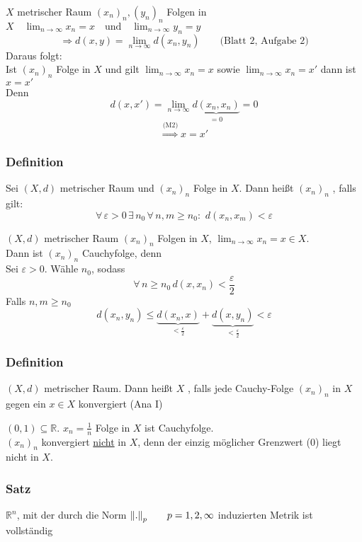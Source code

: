  $X$ metrischer Raum $(x_n)_n , (y_n)_n$ Folgen in $X \quad \lim_{n \to \infty}x_n=x \quad \text{und} \quad \lim_{n \to \infty}y_n=y$
\[
	\Rightarrow d(x,y)=\lim_{n \to \infty}d(x_n,y_n) \qquad \text{(Blatt 2, Aufgabe 2)}
\]
Daraus folgt: \\ Ist $(x_n)_n $ Folge in $X$ und gilt $\lim_{n \to \infty}x_n=x$ sowie $\lim_{n \to \infty}x_n=x'$ dann ist $x=x'$ \\
Denn \[
	d(x,x')=\lim_{n \to \infty}\underset{=0}{\underbrace{d(x_n,x_n)}}=0
\]
\[
	\stackrel{\text{(M2)}}{\Rightarrow} x=x'
\] \bewende

\subsubsection[Cauchyfolge im metrischen Raum]{Definition} %
\label{ssub:definition}
Sei $(X,d)$ metrischer Raum und $(x_n)_n $ Folge in $X$. Dann heißt $(x_n)_n$ , falls gilt:
\[
	\forall\, \varepsilon >0 \, \exists \, n_0 \, \forall\, n,m \geq n_0: \,\, d(x_n,x_m)<\varepsilon 
\]

 $(X,d)$ metrischer Raum $(x_n)_n $ Folgen in $X$, $\lim_{n \to \infty}x_n=x \in X$. \\
Dann ist $(x_n)_n$ Cauchyfolge, denn \\
Sei $\varepsilon >0$. Wähle $n_0$, sodass \[  \forall\, n \geq n_0 \, d(x,x_n)< \frac{\varepsilon}{2} \]
Falls $n,m \geq n_0$
\[
	d(x_n,y_n) \leq \underset{<\frac{\varepsilon}{2}}{\underbrace{d(x_n,x)}} + \underset{<\frac{\varepsilon}{2}}{\underbrace{d(x,y_n)}} < \varepsilon 
\]

\subsubsection[Vollständigkeit]{Definition} %
\label{ssub:definition}
$(X,d)$ metrischer Raum. Dann heißt $X$ , falls jede Cauchy-Folge $(x_n)_n $ in $X$ gegen ein $x \in X$ konvergiert (Ana I)


	$(0,1) \subseteq \mathbb{R}$.
	$x_n = \frac{1}{n}$ Folge in $X$ ist Cauchyfolge. \\
	$(x_n)_n$ konvergiert \underline{nicht} in $X$, denn der einzig möglicher Grenzwert (0) liegt nicht in $X$.


\subsubsection{Satz} %
\label{ssub:satz}
$\mathbb{R}^n$, mit der durch die Norm $\norm{.}_p \qquad p=1,2,\infty$ induzierten Metrik ist vollständig

